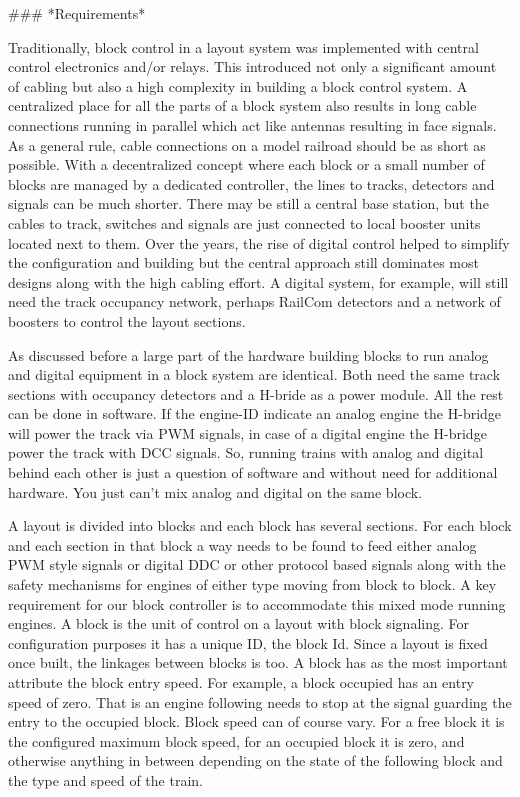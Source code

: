 ### *Requirements*

Traditionally, block control in a layout system was implemented with central control electronics and/or relays. This introduced not only a significant amount of cabling but also a high complexity in building a block control system. A centralized place for all the parts of a block system also results in long cable connections running in parallel which act like antennas resulting in face signals. As a general rule, cable connections on a model railroad should be as short as possible. With a decentralized concept where each block or a small number of blocks are managed by a dedicated controller, the lines to tracks, detectors and signals can be much shorter. There may be still a central base station, but the cables to track, switches and signals are just connected to local booster units located next to them. Over the years, the rise of digital control helped to simplify the configuration and building but the central approach still dominates most designs along with the high cabling effort. A digital system, for example, will still need the track occupancy network, perhaps RailCom detectors and a network of boosters to control the layout sections.

As discussed before a large part of the hardware building blocks to run analog and digital equipment in a block system are identical. Both need the same track sections with occupancy detectors and a H-bride as a power module. All the rest can be done in software. If the engine-ID indicate an analog engine the H-bridge will power the track via PWM signals, in case of a digital engine the H-bridge power the track with DCC signals. So, running trains with analog and digital behind each other is just a question of software and without need for additional hardware. You just can’t mix analog and digital on the same block.

A layout is divided into blocks and each block has several sections. For each block and each section in that block a way needs to be found to feed either analog PWM style signals or digital DDC or other protocol based signals along with the safety mechanisms for engines of either type moving from block to block. A key requirement for our block controller is to accommodate this mixed mode running engines. A block is the unit of control on a layout with block signaling. For configuration purposes it has a unique ID, the block Id. Since a layout is fixed once built, the linkages between blocks is too. A block has as the most important attribute the block entry speed. For example, a block occupied has an entry speed of zero. That is an engine following needs to stop at the signal guarding the entry to the occupied block. Block speed can of course vary. For a free block it is the configured maximum block speed, for an occupied block it is zero, and otherwise anything in between depending on the state of the following block and the type and speed of the train.

